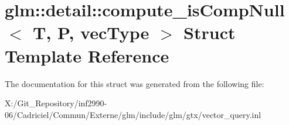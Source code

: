 \hypertarget{structglm_1_1detail_1_1compute__is_comp_null}{\section{glm\-:\-:detail\-:\-:compute\-\_\-is\-Comp\-Null$<$ T, P, vec\-Type $>$ Struct Template Reference}
\label{structglm_1_1detail_1_1compute__is_comp_null}
}


The documentation for this struct was generated from the following file\-:\begin{DoxyCompactItemize}
\item 
X\-:/\-Git\-\_\-\-Repository/inf2990-\/06/\-Cadriciel/\-Commun/\-Externe/glm/include/glm/gtx/vector\-\_\-query.\-inl\end{DoxyCompactItemize}

